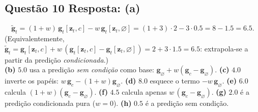 \documentclass[11pt,a4paper]{article}
\begin{document}
\subsection*{Questão 10 \textemdash{} Resposta: (a)}
\[
\tilde{\mathbf{g}}_t = (1 + w)\,\mathbf{g}_t[\mathbf{z}_t, c] - w\,\mathbf{g}_t[\mathbf{z}_t, \varnothing] = (1+3)\cdot 2 - 3\cdot 0.5 = 8 - 1.5 = 6.5.
\]
(Equivalentemente, $\tilde{\mathbf{g}}_t = \mathbf{g}_t[\mathbf{z}_t,c] + w\,(\mathbf{g}_t[\mathbf{z}_t,c] - \mathbf{g}_t[\mathbf{z}_t,\varnothing]) = 2 + 3\cdot 1.5 = 6.5$: extrapola-se a partir da predição \emph{condicionada}.)\\
\textbf{(b)} $5.0$ usa a predição \emph{sem condição} como base: $\mathbf{g}_\varnothing + w(\mathbf{g}_c - \mathbf{g}_\varnothing)$.
\textbf{(c)} $4.0$ inverte os papéis: $w\,\mathbf{g}_c - (1+w)\mathbf{g}_\varnothing$.
\textbf{(d)} $8.0$ esquece o termo $-w\,\mathbf{g}_\varnothing$.
\textbf{(e)} $6.0$ calcula $(1+w)(\mathbf{g}_c - \mathbf{g}_\varnothing)$.
\textbf{(f)} $4.5$ calcula apenas $w\,(\mathbf{g}_c - \mathbf{g}_\varnothing)$.
\textbf{(g)} $2.0$ é a predição condicionada pura ($w = 0$).
\textbf{(h)} $0.5$ é a predição sem condição.

\color{black}
\end{document}
